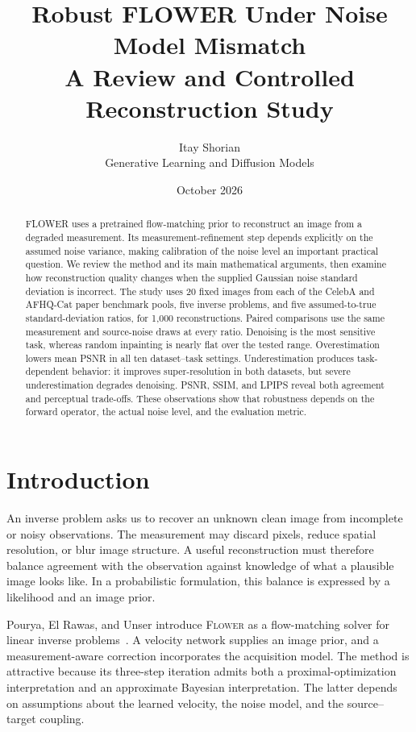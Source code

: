 \documentclass[10pt,letterpaper]{article}
\title{\vspace{-1.0cm}\Large Robust FLOWER Under Noise Model Mismatch\\[4pt]\large A Review and Controlled Reconstruction Study}
\author{Itay Shorian\\\small Generative Learning and Diffusion Models}
\date{\small October 2026}
\newcommand{\flower}{\textsc{Flower}}
\begin{document}
\maketitle
\vspace{-1em}
\begin{abstract}
\noindent
FLOWER uses a pretrained flow-matching prior to reconstruct an image from a degraded measurement. Its measurement-refinement step depends explicitly on the assumed noise variance, making calibration of the noise level an important practical question. We review the method and its main mathematical arguments, then examine how reconstruction quality changes when the supplied Gaussian noise standard deviation is incorrect. The study uses 20 fixed images from each of the CelebA and AFHQ-Cat paper benchmark pools, five inverse problems, and five assumed-to-true standard-deviation ratios, for 1,000 reconstructions. Paired comparisons use the same measurement and source-noise draws at every ratio. Denoising is the most sensitive task, whereas random inpainting is nearly flat over the tested range. Overestimation lowers mean PSNR in all ten dataset--task settings. Underestimation produces task-dependent behavior: it improves super-resolution in both datasets, but severe underestimation degrades denoising. PSNR, SSIM, and LPIPS reveal both agreement and perceptual trade-offs. These observations show that robustness depends on the forward operator, the actual noise level, and the evaluation metric.
\end{abstract}

\section{Introduction}
An inverse problem asks us to recover an unknown clean image from incomplete or noisy observations. The measurement may discard pixels, reduce spatial resolution, or blur image structure. A useful reconstruction must therefore balance agreement with the observation against knowledge of what a plausible image looks like. In a probabilistic formulation, this balance is expressed by a likelihood and an image prior.

Pourya, El Rawas, and Unser introduce \flower{} as a flow-matching solver for linear inverse problems~\cite{flower}. A velocity network supplies an image prior, and a measurement-aware correction incorporates the acquisition model. The method is attractive because its three-step iteration admits both a proximal-optimization interpretation and an approximate Bayesian interpretation. The latter depends on assumptions about the learned velocity, the noise model, and the source--target coupling.
\end{document}
